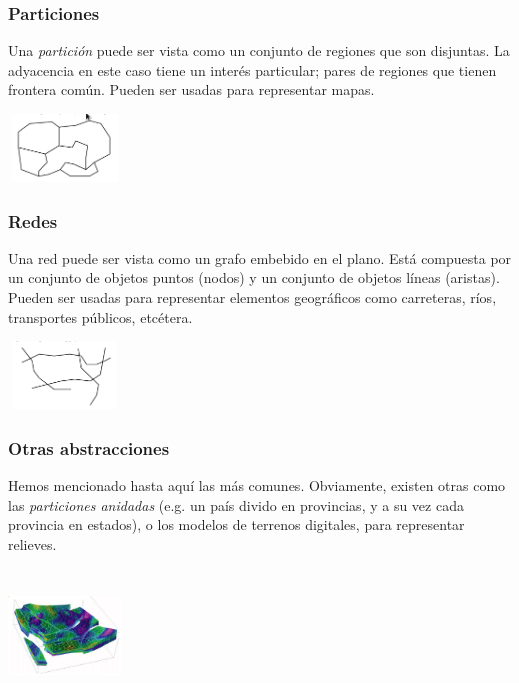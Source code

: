 \documentclass[a4paper,12pt,oneside]{report}
\begin{document}
\subsubsection*{Particiones}
Una \textit{partici\'on} puede ser vista como un conjunto de regiones que son disjuntas. La adyacencia en este caso tiene un inter\'es particular; pares de regiones que tienen frontera com\'un. Pueden ser usadas para representar mapas.
\ \\
\begin{center}\includegraphics[width=3cm,height=1.8cm]{Imagenes/particion.png}
\end{center}
\subsubsection*{Redes}
Una red puede ser vista como un grafo embebido en el plano. Est\'a compuesta por un conjunto de objetos puntos (nodos) y un conjunto de objetos l\'ineas (aristas). Pueden ser usadas para representar elementos geogr\'aficos como carreteras, r\'ios, transportes p\'ublicos, etc\'etera.
\ \\
\begin{center}\includegraphics[width=3cm,height=1.8cm]{Imagenes/red.png}
\end{center}

\subsubsection*{Otras abstracciones}
Hemos mencionado hasta aqu\'i las m\'as comunes. Obviamente, existen otras como las \textit{particiones anidadas} (e.g. un pa\'is divido en provincias, y a su vez cada provincia en estados), o los modelos de terrenos digitales, para representar relieves.\\
\ \\
\begin{center}\includegraphics[width=3cm,height=2.5cm]{Imagenes/relieves.png}
\end{center}
\end{document}
